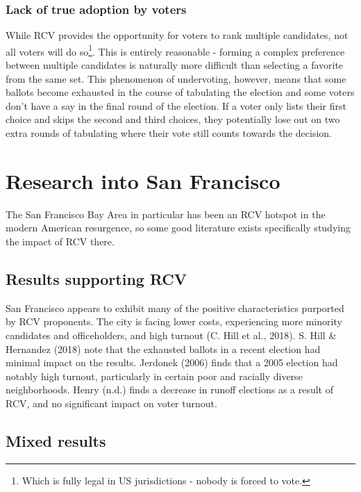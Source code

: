 \documentclass[12pt,twoside]{reedthesis}
\begin{document}
\hypertarget{lack-of-true-adoption-by-voters}{%
\subsubsection{Lack of true adoption by voters}\label{lack-of-true-adoption-by-voters}}

While RCV provides the opportunity for voters to rank multiple candidates, not all voters will do so\footnote{Which is fully legal in US jurisdictions - nobody is forced to vote.}. This is entirely reasonable - forming a complex preference between multiple candidates is naturally more difficult than selecting a favorite from the same set. This phenomenon of undervoting, however, means that some ballots become exhausted in the course of tabulating the election and some voters don't have a say in the final round of the election. If a voter only lists their first choice and skips the second and third choices, they potentially lose out on two extra rounds of tabulating where their vote still counts towards the decision.

\hypertarget{research-into-san-francisco}{%
\section{Research into San Francisco}\label{research-into-san-francisco}}

The San Francisco Bay Area in particular has been an RCV hotspot in the modern American resurgence, so some good literature exists specifically studying the impact of RCV there.

\hypertarget{results-supporting-rcv}{%
\subsection{Results supporting RCV}\label{results-supporting-rcv}}

San Francisco appears to exhibit many of the positive characteristics purported by RCV proponents. The city is facing lower costs, experiencing more minority candidates and officeholders, and high turnout (C. Hill et al., 2018). S. Hill \& Hernandez (2018) note that the exhausted ballots in a recent election had minimal impact on the results. Jerdonek (2006) finds that a 2005 election had notably high turnout, particularly in certain poor and racially diverse neighborhoods. Henry (n.d.) finds a decrease in runoff elections as a result of RCV, and no significant impact on voter turnout.

\hypertarget{mixed-results}{%
\subsection{Mixed results}\label{mixed-results}}
\end{document}

